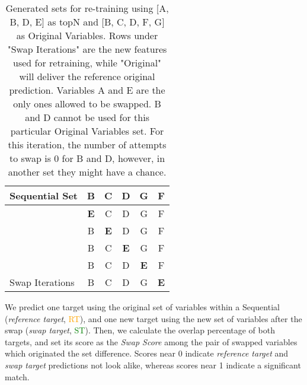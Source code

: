 \begin{table}[!htbp]
{\begin{tabular}{l|c|c|c|c|c|}
\multicolumn{1}{|l|}{Sequential Set}                          & B                                  & C                                  & D                                  & G                                  & F                                  \\ \hline
\multicolumn{1}{|l|}{}                                  & \cellcolor{blue}\textbf{E} & \cellcolor[HTML]{F1F8F6}C          & \cellcolor[HTML]{F1F8F6}D          & \cellcolor[HTML]{F1F8F6}G          & \cellcolor[HTML]{F1F8F6}F          \\ \cline{2-6} 
\multicolumn{1}{|l|}{}                                  & B                                  & \cellcolor{blue}\textbf{E} & D                                  & G                                  & F                                  \\ \cline{2-6} 
\multicolumn{1}{|l|}{}                                  & \cellcolor[HTML]{F1F8F6}B          & \cellcolor[HTML]{F1F8F6}C          & \cellcolor{blue}\textbf{E} & \cellcolor[HTML]{F1F8F6}G          & \cellcolor[HTML]{F1F8F6}F          \\ \cline{2-6} 
\multicolumn{1}{|l|}{}                                  & B                                  & C                                  & D                                  & \cellcolor{blue}\textbf{E} & F                                  \\ \cline{2-6} 
\multicolumn{1}{|l|}{\multirow{-5}{*}{Swap Iterations}} & \cellcolor[HTML]{F1F8F6}B          & \cellcolor[HTML]{F1F8F6}C          & \cellcolor[HTML]{F1F8F6}D          & \cellcolor[HTML]{F1F8F6}G          & \cellcolor{blue}\textbf{E} \\ \hline
\end{tabular}%
}
\label{tbl:swap-example}
\caption{Generated sets for re-training using [A, B, D, E] as topN and [B, C, D, F, G] as Original Variables. Rows under "Swap Iterations" are the new features used for retraining, while "Original" will deliver the reference original prediction. Variables A and E are the only ones allowed to be swapped. B and D cannot be used for this particular Original Variables set. For this iteration, the number of attempts to swap is 0 for B and D, however, in another set they might have a chance.}
\end{table}

We predict one target using the original set of variables within a Sequential (\emph{reference target}, \textcolor{orange}{RT}), and one new target using the new set of variables after the swap (\emph{swap target}, \textcolor{green}{ST}). Then, we calculate the overlap percentage of both targets, and set its score as the \emph{Swap Score} among the pair of swapped variables which originated the set difference. Scores near 0 indicate \emph{reference target} and \emph{swap target} predictions not look alike, whereas scores near 1 indicate a significant match.

